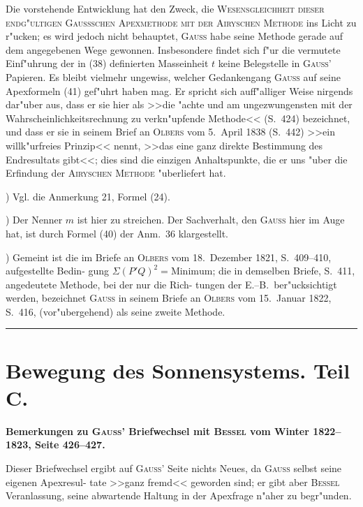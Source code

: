 \documentclass[12pt,a4paper]{article}
\theoremstyle{plain}
\theoremstyle{definition}
\theoremstyle{remark}
\begin{document}
Die vorstehende Entwicklung hat den Zweck, die \textsc{Wesensgleichheit dieser endg"ultigen
Gauss\-schen Apexmethode mit der Airyschen Methode} ins Licht zu r"ucken; es wird jedoch
nicht behauptet, \textsc{Gauss} habe seine Methode gerade auf dem angegebenen Wege gewonnen. Insbesondere
findet sich f"ur die vermutete Einf"uhrung der in (38) definierten Masseinheit $t$ keine Belegstelle in \textsc{Gauss}'
Papieren. Es bleibt vielmehr ungewiss, welcher Gedankengang \textsc{Gauss} auf seine Apexformeln (41) gef"uhrt
haben mag. Er spricht sich auff"alliger Weise nirgends dar"uber aus, dass er sie hier als >>die "achte und
am ungezwungensten mit der Wahrscheinlichkeitsrechnung zu verkn"upfende Methode<< (S.~424) bezeichnet,
und dass er sie in seinem Brief an \textsc{Olbers} vom 5.~April 1838 (S.~442) >>ein willk"urfreies Prinzip<< nennt, >>das
eine ganz direkte Bestimmung des Endresultats gibt<<; dies sind die einzigen Anhaltspunkte, die er uns "uber
die Erfindung der \textsc{Airyschen Methode} "uberliefert hat.

\bigskip
{}) Vgl. die Anmerkung 21, Formel (24).

\smallskip{}) Der Nenner $m$ ist hier zu streichen. Der Sachverhalt, den \textsc{Gauss} hier im Auge hat, ist durch
Formel (40) der Anm.~36 klargestellt.

\smallskip{}) Gemeint ist die im Briefe an \textsc{Olbers} vom 18.~Dezember 1821, S.~409--410, aufgestellte Bedin-
gung $\Sigma(P'Q)^2 = \text{Minimum}$; die in demselben Briefe, S.~411, angedeutete Methode, bei der nur die Rich-
tungen der E.--B.\ ber"ucksichtigt werden, bezeichnet \textsc{Gauss} in seinem Briefe an \textsc{Olbers} vom 15.~Januar 1822,
S.~416, (vor"ubergehend) als seine zweite Methode.

\vspace{1em}
\hrule
\vspace{1em}

\section*{Bewegung des Sonnensystems. Teil C.}

\textbf{Bemerkungen zu \textsc{Gauss}' Briefwechsel mit \textsc{Bessel} vom Winter 1822--1823,
Seite 426--427.}

Dieser Briefwechsel ergibt auf \textsc{Gauss}' Seite nichts Neues, da \textsc{Gauss} selbst seine eigenen Apexresul-
tate >>ganz fremd<< geworden sind; er gibt aber \textsc{Bessel} Veranlassung, seine abwartende Haltung in der
Apexfrage n"aher zu begr"unden.
\end{document}
